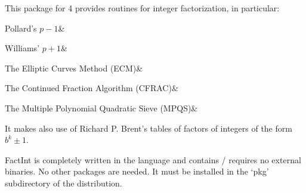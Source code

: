 
This package for {\GAP} 4 provides routines for 
integer factorization, in particular:

\beginitems
Pollard's $p-1$&

Williams' $p+1$&

The Elliptic Curves Method (ECM)&

The Continued Fraction Algorithm (CFRAC)&

The Multiple Polynomial Quadratic Sieve (MPQS)&
\enditems

It makes also use of Richard P. Brent's tables of factors of integers of
the form $b^k \pm 1$.

FactInt is completely written in the {\GAP} language and contains /
requires no external binaries. No other packages are needed.
It must be installed in the `pkg' subdirectory of the
{\GAP} distribution.

